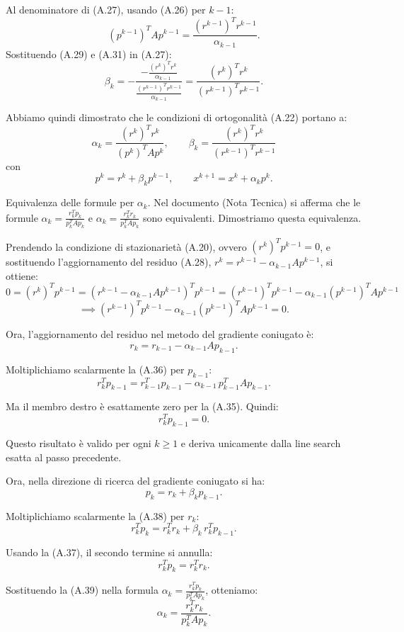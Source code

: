 \documentclass[italian, a4paper, twoside, binding=6mm]{sapthesis}
\begin{document}
Al denominatore di (A.27), usando (A.26) per \(k-1\):
\[
(p^{k-1})^T A p^{k-1}=\frac{(r^{k-1})^T r^{k-1}}{\alpha_{k-1}}. \tag{A.31}
\]
Sostituendo (A.29) e (A.31) in (A.27):
\[
\beta_k
= -\frac{-\frac{(r^k)^T r^k}{\alpha_{k-1}}}{\frac{(r^{k-1})^T r^{k-1}}{\alpha_{k-1}}}
= \frac{(r^k)^T r^k}{(r^{k-1})^T r^{k-1}}. \tag{A.32}
\]

Abbiamo quindi dimostrato che le condizioni di ortogonalità (A.22) portano a:
\[
\alpha_k=\frac{(r^k)^T r^k}{(p^k)^T A p^k},\qquad
\beta_k=\frac{(r^k)^T r^k}{(r^{k-1})^T r^{k-1}}
\tag{A.33}
\]
con
\[
p^k=r^k+\beta_k p^{k-1},\qquad x^{k+1}=x^k+\alpha_k p^k. \tag{A.34}
\]

\medskip
\noindent
Equivalenza delle formule per $\alpha_k$.
Nel documento (Nota Tecnica) si afferma che le formule $\alpha_k = \frac{r_k^T p_k}{p_k^T A p_k}$ e $\alpha_k = \frac{r_k^T r_k}{p_k^T A p_k}$ sono equivalenti. Dimostriamo questa equivalenza.

Prendendo la condizione di stazionarietà (A.20), ovvero $(r^k)^T p^{k-1} = 0$, e sostituendo l'aggiornamento del residuo (A.28), $r^k = r^{k-1} - \alpha_{k-1} A p^{k-1}$, si ottiene:
\[
0 = (r^k)^T p^{k-1} = (r^{k-1} - \alpha_{k-1} A p^{k-1})^T p^{k-1}
= (r^{k-1})^T p^{k-1} - \alpha_{k-1} (p^{k-1})^T A p^{k-1}\]\[\implies
(r^{k-1})^T p^{k-1} - \alpha_{k-1} (p^{k-1})^T A p^{k-1} = 0. \tag{A.35}
\]

Ora, l'aggiornamento del residuo nel metodo del gradiente coniugato è:
\[
r_k = r_{k-1} - \alpha_{k-1} A p_{k-1}. \tag{A.36}
\]

Moltiplichiamo scalarmente la (A.36) per $p_{k-1}$:
\[
r_k^T p_{k-1} = r_{k-1}^T p_{k-1} - \alpha_{k-1} \, p_{k-1}^T A p_{k-1}.
\]

Ma il membro destro è esattamente zero per la (A.35). Quindi:
\[
r_k^T p_{k-1} = 0. \tag{A.37}
\]

Questo risultato è valido per ogni $k \ge 1$ e deriva unicamente dalla line search esatta al passo precedente.

Ora, nella direzione di ricerca del gradiente coniugato si ha:
\[
p_k = r_k + \beta_k p_{k-1}. \tag{A.38}
\]

Moltiplichiamo scalarmente la (A.38) per $r_k$:
\[
r_k^T p_k = r_k^T r_k + \beta_k \, r_k^T p_{k-1}.
\]

Usando la (A.37), il secondo termine si annulla:
\[
r_k^T p_k = r_k^T r_k. \tag{A.39}
\]

Sostituendo la (A.39) nella formula $\alpha_k = \frac{r_k^T p_k}{p_k^T A p_k}$, otteniamo:
\[
\alpha_k = \frac{r_k^T r_k}{p_k^T A p_k}. \tag{A.40}
\]
\end{document}
